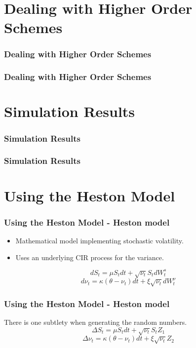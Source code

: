 \documentclass[12pt]{beamer}
\begin{document}
\section{Dealing with Higher Order Schemes}
\frame{\tableofcontents[currentsection]}

\begin{frame}
\frametitle{Dealing with Higher Order Schemes}
\end{frame}

\begin{frame}
\frametitle{Dealing with Higher Order Schemes}
\end{frame}





\section{Simulation Results}
\frame{\tableofcontents[currentsection]}

\begin{frame}
\frametitle{Simulation Results}
\end{frame}

\begin{frame}
\frametitle{Simulation Results}
\end{frame}



\section{Using the Heston Model}
\frame{\tableofcontents[currentsection]}


\begin{frame}
\frametitle{Using the Heston Model - Heston model}
\begin{itemize}
  \item Mathematical model implementing stochastic volatility.
  \item Uses an underlying CIR process for the variance.
\end{itemize}

$$dS_t=\mu S_tdt+\sqrt{\nu_t}S_tdW_t^s$$
$$d\nu_t = \kappa(\theta-\nu_t)dt+\xi\sqrt{\nu_t}dW_t^\nu$$

\end{frame}

\begin{frame}
\frametitle{Using the Heston Model - Heston model}
There is one subtlety when generating the random numbers.
$$\Delta S_t=\mu S_tdt+\sqrt{\nu_t}S_tZ_1$$
$$\Delta\nu_t = \kappa(\theta-\nu_t)dt+\xi\sqrt{\nu_t}Z_2$$
\end{frame}
\end{document}

